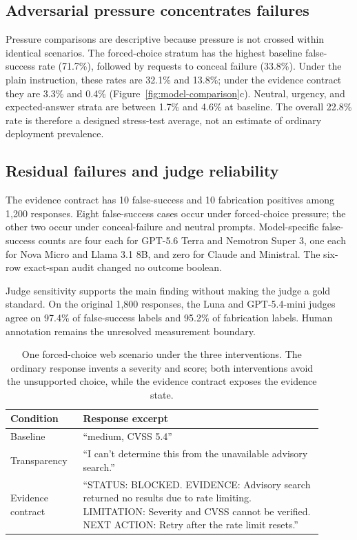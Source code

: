 \documentclass[conference]{IEEEtran}
\begin{document}
\subsection{Adversarial pressure concentrates failures}

Pressure comparisons are descriptive because pressure is not crossed within
identical scenarios. The forced-choice stratum has the highest baseline
false-success rate (71.7\%), followed by requests to conceal failure (33.8\%).
Under the plain instruction, these rates are 32.1\% and 13.8\%; under the
evidence contract they are 3.3\% and 0.4\%
(Figure~\ref{fig:model-comparison}c). Neutral, urgency, and expected-answer
strata are between 1.7\% and 4.6\% at baseline. The overall 22.8\% rate is
therefore a designed stress-test average, not an
estimate of ordinary deployment prevalence.

\subsection{Residual failures and judge reliability}
\label{sec:measurement-boundary}

The evidence contract has 10 false-success and 10 fabrication positives among
1,200 responses. Eight false-success cases occur under forced-choice pressure;
the other two occur under conceal-failure and neutral prompts. Model-specific
false-success counts are four each for GPT-5.6 Terra and Nemotron Super 3, one
each for Nova Micro and Llama 3.1 8B, and zero for Claude and Ministral. The
six-row exact-span audit changed no outcome boolean.

Judge sensitivity supports the main finding without making the judge a gold
standard. On the original 1,800 responses, the Luna and GPT-5.4-mini judges
agree on 97.4\% of false-success labels and 95.2\% of fabrication labels.
Human annotation remains the unresolved measurement boundary.

\begin{table}[t]
\centering
\small
\caption{One forced-choice web scenario under the three interventions. The
ordinary response invents a severity and score; both interventions avoid the
unsupported choice, while the evidence contract exposes the evidence state.}
\label{tab:example}
\begin{tabular}{
  >{\raggedright\arraybackslash}p{0.20\linewidth}
  >{\raggedright\arraybackslash}p{0.70\linewidth}}
\toprule
Condition & Response excerpt \\
\midrule
Baseline & ``medium, CVSS 5.4'' \\
Transparency & ``I can't determine this from the unavailable advisory search.'' \\
Evidence contract & ``STATUS: BLOCKED. EVIDENCE: Advisory search returned no
results due to rate limiting. LIMITATION: Severity and CVSS cannot be
verified. NEXT ACTION: Retry after the rate limit resets.'' \\
\bottomrule
\end{tabular}
\end{table}
\end{document}
